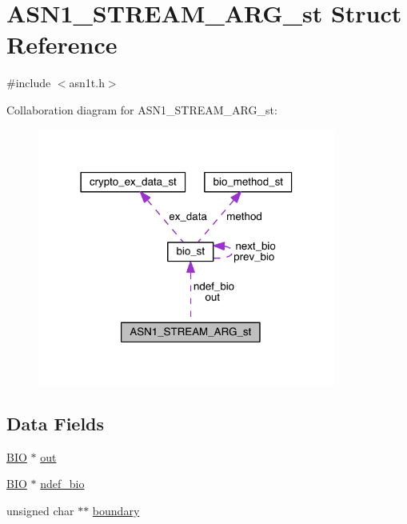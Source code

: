 \hypertarget{struct_a_s_n1___s_t_r_e_a_m___a_r_g__st}{}\section{A\+S\+N1\+\_\+\+S\+T\+R\+E\+A\+M\+\_\+\+A\+R\+G\+\_\+st Struct Reference}
\label{struct_a_s_n1___s_t_r_e_a_m___a_r_g__st}


{\ttfamily \#include $<$asn1t.\+h$>$}



Collaboration diagram for A\+S\+N1\+\_\+\+S\+T\+R\+E\+A\+M\+\_\+\+A\+R\+G\+\_\+st\+:\nopagebreak
\begin{figure}[H]
\begin{center}
\leavevmode
\includegraphics[width=278pt]{struct_a_s_n1___s_t_r_e_a_m___a_r_g__st__coll__graph}
\end{center}
\end{figure}
\subsection*{Data Fields}
\begin{DoxyCompactItemize}
\item 
\hyperlink{crypto_2bio_2bio_8h_af3fabae1c9af50b9312cdff41e11d1dd}{B\+IO} $\ast$ \hyperlink{struct_a_s_n1___s_t_r_e_a_m___a_r_g__st_a05bc032abf108b32fc96d54922811784}{out}
\item 
\hyperlink{crypto_2bio_2bio_8h_af3fabae1c9af50b9312cdff41e11d1dd}{B\+IO} $\ast$ \hyperlink{struct_a_s_n1___s_t_r_e_a_m___a_r_g__st_a02905dfadca023387ba4f340b68c49b4}{ndef\+\_\+bio}
\item 
unsigned char $\ast$$\ast$ \hyperlink{struct_a_s_n1___s_t_r_e_a_m___a_r_g__st_a0b7dcabcdeeb7470bc834c33eae75a09}{boundary}
\end{DoxyCompactItemize}


